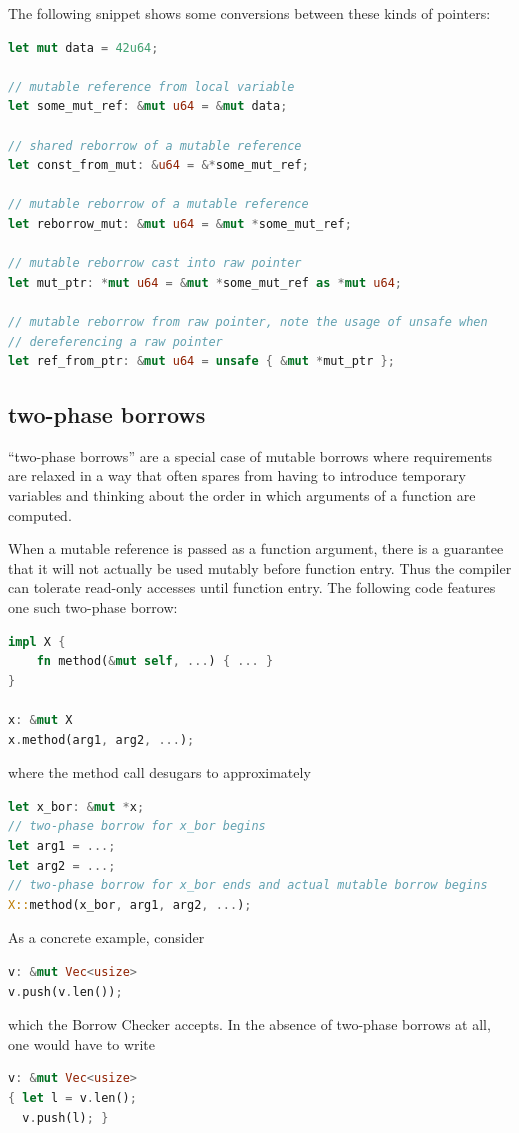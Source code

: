\documentclass[a4paper,11pt]{article}
\theoremstyle{plain}
\theoremstyle{definition}
\theoremstyle{remark}
\begin{document}
The following snippet shows some conversions between these kinds of pointers:
\begin{lstlisting}[language=rust]
let mut data = 42u64;

// mutable reference from local variable
let some_mut_ref: &mut u64 = &mut data;

// shared reborrow of a mutable reference
let const_from_mut: &u64 = &*some_mut_ref;

// mutable reborrow of a mutable reference
let reborrow_mut: &mut u64 = &mut *some_mut_ref;

// mutable reborrow cast into raw pointer
let mut_ptr: *mut u64 = &mut *some_mut_ref as *mut u64;

// mutable reborrow from raw pointer, note the usage of unsafe when
// dereferencing a raw pointer
let ref_from_ptr: &mut u64 = unsafe { &mut *mut_ptr };
\end{lstlisting}

\subsection{two-phase borrows}

``two-phase borrows'' are a special case of mutable borrows where requirements
are relaxed in a way that often spares from having to introduce temporary variables
and thinking about the order in which arguments of a function are computed.

When a mutable reference is passed as a function argument, there is a guarantee
that it will not actually be used mutably before function entry. Thus the compiler
can tolerate read-only accesses until function entry.
The following code features one such two-phase borrow:
\begin{lstlisting}[language=rust]
impl X {
    fn method(&mut self, ...) { ... }
}

x: &mut X
x.method(arg1, arg2, ...);
\end{lstlisting}
where the method call desugars to approximately
\begin{lstlisting}[language=rust]
let x_bor: &mut *x;
// two-phase borrow for x_bor begins
let arg1 = ...;
let arg2 = ...;
// two-phase borrow for x_bor ends and actual mutable borrow begins
X::method(x_bor, arg1, arg2, ...);
\end{lstlisting}

As a concrete example, consider
\begin{lstlisting}[language=rust]
v: &mut Vec<usize>
v.push(v.len());
\end{lstlisting}
which the Borrow Checker accepts.
In the absence of two-phase borrows at all, one would have to write
\begin{lstlisting}[language=rust]
v: &mut Vec<usize>
{ let l = v.len();
  v.push(l); }
\end{lstlisting}
\end{document}
